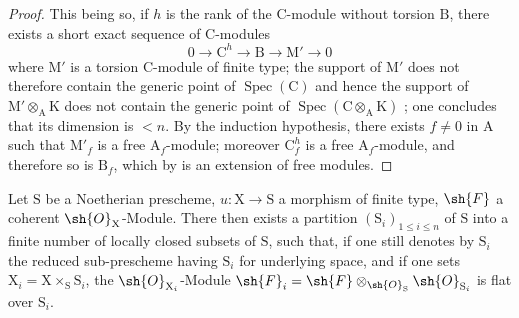 \begin{proof}
This being so, if $h$ is the rank of the $\mathrm{C}$-module without torsion $\mathrm{B}$, there exists a short exact sequence of $\mathrm{C}$-modules
\[
0\to\mathrm{C}^h\to\mathrm{B}\to\mathrm{M}'\to 0
\]
where $\mathrm{M}'$ is a torsion $\mathrm{C}$-module of finite type; the support of $\mathrm{M}'$ does not therefore contain the generic point of $\operatorname{Spec}(\mathrm{C})$  and hence the support of $\mathrm{M}'\otimes_\mathrm{A}\mathrm{K}$ does not contain the generic point of $\operatorname{Spec}(\mathrm{C}\otimes_\mathrm{A}\mathrm{K})$ ; one concludes  that its dimension is $<n$. By the induction hypothesis, there exists $f\neq 0$ in $\mathrm{A}$ such that $\mathrm{M}'_f$ is a free $\mathrm{A}_f$-module; moreover $\mathrm{C}^h_f$ is a free $\mathrm{A}_f$-module, and therefore so is $\mathrm{B}_f$, which by  is an extension of free modules.
\end{proof}

\begin{corollary}[6.9.3]
\label{IV.6.9.3}
Let $\mathrm{S}$ be a Noetherian prescheme, $u:\mathrm{X}\to\mathrm{S}$ a morphism of finite type, $\sh{F}$ a coherent $\sh{O}_\mathrm{X}$-Module. There then exists a partition $(\mathrm{S}_i)_{1\leqslant i\leqslant n}$ of $\mathrm{S}$ into a finite number of locally closed subsets of $\mathrm{S}$, such that, if one still denotes by $\mathrm{S}_i$ the reduced sub-prescheme having $\mathrm{S}_i$ for underlying space, and if one sets $\mathrm{X}_i=\mathrm{X}\times_\mathrm{S}\mathrm{S}_i$, the $\sh{O}_{\mathrm{X}_i}$-Module $\sh{F}_i=\sh{F}\otimes_{\sh{O}_\mathrm{S}}\sh{O}_{\mathrm{S}_i}$ is flat over $\mathrm{S}_i$.
\end{corollary}

